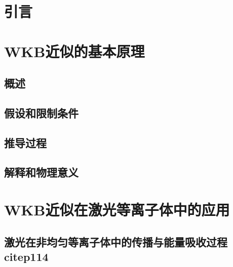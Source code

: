 \documentclass[12pt, a4paper, oneside]{ctexart}
\title{}
\date{\today}
\author{202011010101物理2001孙陶庵}
\begin{document}
\begin{spacing}{2.0}
\tableofcontents
\maketitle

\section{引言}
\subsection{}
\subsection{}
\section{WKB近似的基本原理}

\subsection{概述}
\subsection{假设和限制条件}
\subsection{推导过程}
\subsection{解释和物理意义}


\section{WKB近似在激光等离子体中的应用}
\subsection{激光在非均匀等离子体中的传播与能量吸收过程citep114}
\subsection{}
\subsection{}
\subsection{}

\end{spacing}
\end{document}

